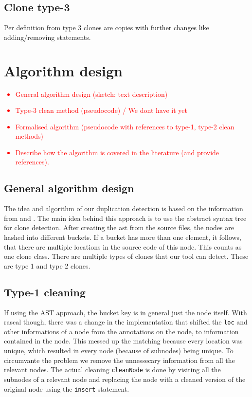 \documentclass{uva-inf-article}
\newcommand\todo[1]{\textcolor{red}{#1}}
\begin{document}
\subsection{Clone type-3}
Per definition from \cite{koschke2008identifying} type 3 clones are copies with further changes like adding/removing statements.

\section{Algorithm design}

\todo {
	\begin{itemize}
		\item{General algorithm design (sketch: text description) }
		\item{Type-3 clean method (pseudocode) / We dont have it yet }
		\item{Formalised algorithm (pseudocode with references to type-1, type-2 clean methods)}
		\item{Describe how the algorithm is covered in the literature (and provide references).}
	\end{itemize}
}

\subsection{General algorithm design}

The idea and algorithm of our duplication detection is based on the
information from \cite{lazar2014clone} and \cite{baxter1998clone}. 
The main idea behind this approach is to use the abstract syntax tree for clone detection.
After creating the ast from the source files,  the nodes are hashed into different buckets.
If a bucket has more than one element, it follows, that there are multiple locations in the source code of this node.
This counts as one clone class. There are multiple types of clones that our tool can detect.
These are type 1 and type 2 clones.

\subsection{Type-1 cleaning}

If using the AST approach, the bucket key is in general just the node itself. With rascal though, there was a change in the implementation
that shifted the \texttt{loc} and other informations of a node from the annotations on the node, to information contained in the node.
This messed up the matching because every location was unique, which resulted in every node (because of subnodes) being unique. 
To circumvante the problem we remove the unnessecary information from all the relevant nodes. The actual cleaning \texttt{cleanNode} is done
by visiting all the subnodes of a relevant node and replacing the node with a cleaned version of the original node using the \texttt{insert} statement.
\end{document}
